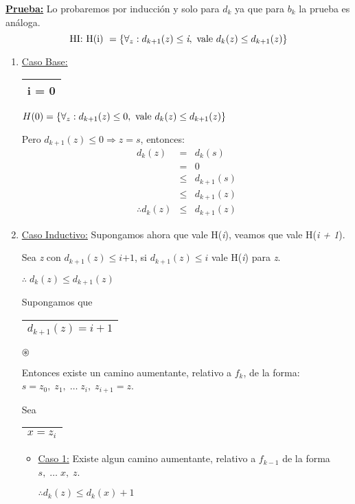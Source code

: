 \documentclass[12pt,a4paper]{report}
\begin{document}
		\textbf{\underline{Prueba:}} Lo probaremos por inducción y solo para $d_{k}$ ya que para $b_{k}$ la prueba es análoga.
			\[ \textup{HI: H(i) } = \lbrace\forall_{z}: d_{k + 1}(z) \leq \textit{i}, \textup{ vale } d_{k}(z) \leq d_{k + 1}(z)\rbrace \]

			\begin{enumerate}
				\item \underline{Caso Base:} \begin{tabular}{|c|} \hline i = 0 \\\hline \end{tabular} \qquad $H(0) = \lbrace\forall_{z}: d_{k + 1}(z) \leq 0, \textup{ vale } d_{k}(z) \leq d_{k + 1}(z)  \rbrace$
					\par Pero $d_{k + 1}(z) \leq 0 \Rightarrow z = \textit{s}$, entonces:
					\begin{eqnarray}
						\nonumber d_{k}(z) &=& d_{k}(s) \\
						\nonumber &=& 0 \\
						\nonumber &\leq & d_{k + 1}(s) \\
						\nonumber &\leq & d_{k + 1}(z) \\
						\nonumber \therefore d_{k}(z) & \leq & d_{k + 1}(z)
					\end{eqnarray}
				\item \underline{Caso Inductivo:} Supongamos ahora que vale H(\textit{i}), veamos que vale H(\textit{i + 1}).
					\par Sea \textit{z} con $d_{k + 1}(z) \leq \textit{i+1}$, si $d_{k + 1}(z) \leq \textit{i}$ vale H(\textit{i}) para \textit{z}.
					\par \begin{center} $\therefore \; d_{k}(z) \leq d_{k + 1}(z) $ \end{center}
					\par Supongamos que \begin{tabular}{|c|} \hline $d_{k + 1}(z) = i + 1$ \\\hline \end{tabular} $\circledast$
					\par Entonces existe un camino aumentante, relativo a $f_{k}$, de la forma: $s = z_{0}, \; z_{1}, \; \dotsc \; z_{i}, \; z_{i + 1} = z$.
					\par Sea \begin{tabular}{|c|} \hline $x = z_{i}$ \\ \hline \end{tabular}

					\begin{itemize}
						\item \underline{Caso 1:} Existe algun camino aumentante, relativo a $f_{k - 1}$ de la forma $s, \; \dotsc \; x, \; z$.
							\begin{center}
								$\therefore d_{k}(z) \leq d_{k}(x) + 1$
							\end{center}


\end{itemize}
\end{enumerate}
\end{document}
